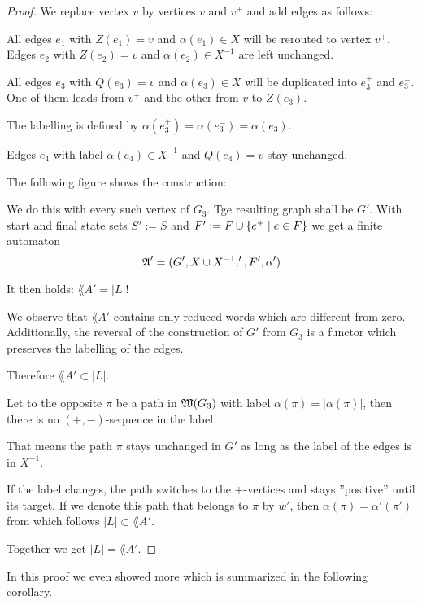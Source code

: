 \begin{proof}
We replace vertex $v$ by vertices $v$ and $v^+$ and add edges as follows:

All edges $e_1$ with $Z(e_1) = v$ and $\alpha(e_1) \in X$ will be rerouted to
vertex $v^+$. Edges $e_2$ with $Z(e_2) = v$ and $\alpha(e_2) \in X^{-1}$ are
left unchanged.

All edges $e_3$ with $Q(e_3) = v$ and $\alpha(e_3) \in X$ will be duplicated
into $e_3^+$ and $e_3^-$. One of them leads from $v^+$ and the other from $v$ to
$Z(e_3)$.

The labelling is defined by $\alpha(e_3^+) = \alpha(e_3^-) = \alpha(e_3)$.

Edges $e_4$ with label $\alpha(e_4) \in X^{-1}$ and $Q(e_4) = v$ stay unchanged.

The following figure shows the construction:

\begin{center}

\end{center}

We do this with every such vertex of $G_3$. Tge resulting graph shall be $G'$.
With start and final state sets $S' := S$ and $F' := F \cup \mbox{$\{e^+ \mid e\in
F\}$}$ we get a finite automaton
\[ \mbox{$\mathfrak{A}$}' = (G', X \cup {X}^{-1}, ', F', \alpha') \]

It then holds: $\lang{A}' = |L|$!

We observe that $\lang{A}'$ contains only reduced words which are different from
zero. Additionally, the reversal of the construction of $G'$ from $G_3$ is a
functor which preserves the labelling of the edges.

Therefore $\lang{A}' \subset |L|$.

Let to the opposite $\pi$ be a path in $\mbox{$\mathfrak{W}(G_3)$}$ with label $\alpha(\pi)
= |\alpha(\pi)|$, then there is no $(+, -)$-sequence in the label.

That means the path $\pi$ stays unchanged in $G'$ as long as the label of the
edges is in $X^{-1}$.

If the label changes, the path switches to the $+$-vertices and stays
''positive'' until its target. If we denote this path that belongs to $\pi$ by
$w'$, then $\alpha(\pi) = \alpha'(\pi')$ from which follows $|L| \subset
\lang{A}'$.

Together we get $|L| = \lang{A'}$.
\end{proof}

In this proof we even showed more which is summarized in the following
corollary.

